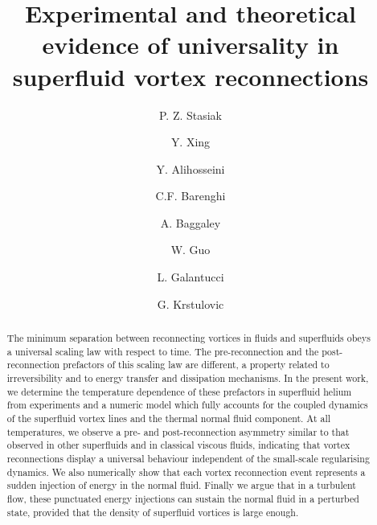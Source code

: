 \documentclass[
  reprint,
superscriptaddress,
 amsmath,amssymb,
 aps,
prb,
]{revtex4-2}
\begin{document}

\title{Experimental and theoretical evidence of universality in superfluid vortex reconnections}

\author{P. Z. Stasiak}

\author{Y. Xing}
\author{Y. Alihosseini}

\author{C.F. Barenghi}
\author{A. Baggaley}

\author{W. Guo}

\author{L. Galantucci}

\author{G. Krstulovic}



\begin{abstract}
The minimum separation between reconnecting vortices
in fluids and superfluids obeys a universal scaling law with respect to time.
The pre-reconnection and the post-reconnection prefactors 
of this scaling law are different, a property related to irreversibility and to energy
transfer and dissipation mechanisms.
In the present work, we determine the temperature dependence of these prefactors in superfluid helium
from experiments and a numeric model which fully accounts for the 
coupled dynamics of the superfluid
vortex lines and the thermal normal fluid component. At all temperatures, we observe 
a pre- and post-reconnection asymmetry similar to that observed in other superfluids
and in classical viscous fluids, indicating that vortex reconnections display a
universal behaviour independent of 
the small-scale regularising dynamics.   
We also numerically show that each vortex reconnection event
represents a sudden injection of energy in the normal fluid. 
Finally we argue that
in a turbulent flow, these punctuated energy injections can sustain 
the normal fluid
in a perturbed state, provided that the density of superfluid vortices is large enough.
\end{abstract}
\end{document}
